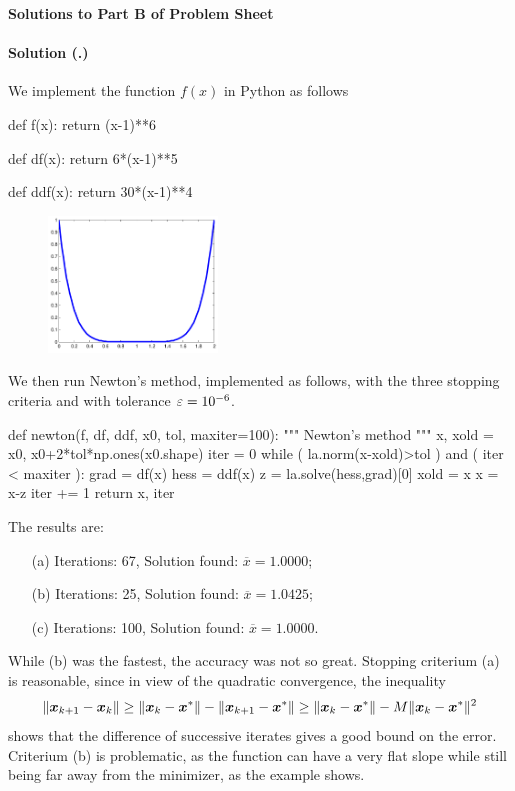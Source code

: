 \documentclass{article}
\newcounter{problemSheetNumber}
\newcounter{problems}
\renewcommand{\solution}[1]{\paragraph{Solution (\theproblemSheetNumber.\theproblems)}\addtocounter{problems}{1}\label{#1}}
\begin{document}
 
\begin{center}
{\Large {\bf Solutions to Part B of Problem Sheet \theproblemSheetNumber}}
\end{center}

\solution{pr:1} We implement the function $f(x)$ in Python as follows

\begin{ipythonnb}
def f(x):
    return (x-1)**6
    
def df(x):
    return 6*(x-1)**5
    
def ddf(x):
    return 30*(x-1)**4
\end{ipythonnb}

\begin{figure}[h!]
 \centering
 \includegraphics[width=0.4\textwidth]{images/flat_cropped.pdf}
\end{figure}

We then run Newton's method, implemented as follows, with the three stopping criteria and with tolerance $\varepsilon=10^{-6}$. 

\begin{ipythonnb}
def newton(f, df, ddf, x0, tol, maxiter=100):
    """
    Newton's method
    """
    x, xold = x0, x0+2*tol*np.ones(x0.shape)
    iter = 0
    while ( la.norm(x-xold)>tol ) and ( iter < maxiter ):
        grad = df(x)
        hess = ddf(x)
        z = la.solve(hess,grad)[0]
        xold = x
        x = x-z
        iter += 1
    return x, iter	
\end{ipythonnb}

The results are:
\begin{itemize}
 \item[(a)] Iterations: 67, Solution found: $\overline{x}=1.0000$;
 \item[(b)] Iterations: 25, Solution found: $\overline{x}=1.0425$;
 \item[(c)] Iterations: 100, Solution found: $\overline{x}=1.0000$.
\end{itemize}
While (b) was the fastest, the accuracy was not so great. Stopping criterium (a) is reasonable, since in view of the quadratic convergence, the inequality
\begin{equation*}
 \Vert {\bm{x}_{k+1}-\bm{x}_k}\Vert\geq \Vert {\bm{x}_k-\bm{x}^*}\Vert-\Vert {\bm{x}_{k+1}-\bm{x}^*}\Vert \geq \Vert {\bm{x}_k-\bm{x}^*}\Vert-M\Vert {\bm{x}_{k}-\bm{x}^*}\Vert^2
\end{equation*}
shows that the difference of successive iterates gives a good bound on the error. Criterium (b) is problematic, as the function can have a very flat slope while still being far away from the minimizer, as the example shows.
\end{document}
